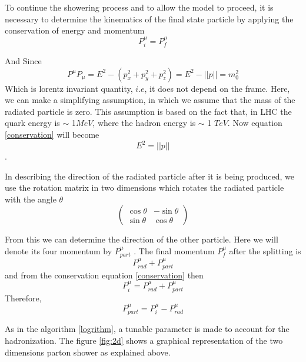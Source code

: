 To continue the showering process and to allow the model to proceed, it is necessary to determine the kinematics of the final state particle by applying the conservation of energy and momentum 
\begin{equation}
P_i^{\mu} = P_f^{\mu}
\end{equation}\label{conservation}

And Since \begin{equation}
  P^{\mu} P_{\mu} = E^2 - (p_x^2 + p_y^2 + p_z^2) = E^2 - ||p|| = m_0^2
\end{equation}
Which is lorentz invariant quantity, $i.e$, it does not depend on the frame. Here, we can make a simplifying assumption, in which we assume that the mass of the radiated particle is zero. This assumption is based on the fact that, in LHC the quark energy is $\sim$ 1$\si{MeV}$,
where
the hadron energy is $\sim$ 1 $\si{TeV}$. Now equation \ref{conservation} will become \begin{equation}\label{important}
E^2 = ||p||
\end{equation}\citep{Salam:2010zt}.    
  
In describing the direction of the radiated particle after it is being produced, we use the rotation matrix in two dimensions which rotates the radiated particle with the angle $\theta$ 
\begin{equation}
\begin{pmatrix}
\cos \theta & - \sin \theta\\
\sin \theta & \cos \theta
\end{pmatrix}
\end{equation}   

From this we can determine the direction of the other particle. Here we will denote its four momentum by $P_{part}^{\mu}$ . The final momentum  $P^{\mu}_{f}$ after the splitting is 
\begin{equation}
P_{rad}^{\mu} + P_{part}^{\mu}
\end{equation} and from the conservation equation \ref{conservation} then \begin{equation}
P^{\mu}_{i} = P_{rad}^{\mu} + P_{part}^{\mu}
\end{equation} Therefore, \begin{equation}
P_{part}^{\mu} = P^{\mu}_{i} - P_{rad}^{\mu} 
\end{equation}     

As in the algorithm \ref{logrithm},
a tunable parameter
is made to account for the hadronization. The figure \ref{fig:2d} shows a graphical representation of the two dimensions parton shower as explained above.
     
